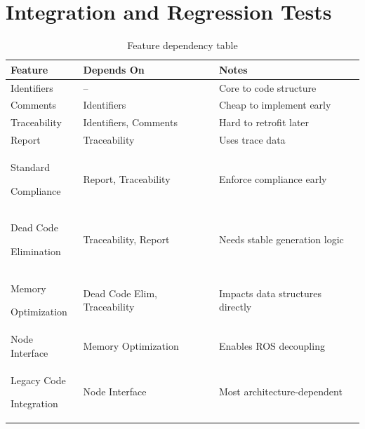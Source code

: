 \section{Integration and Regression Tests}
\label{app:int_and_reg_tests}


\bgroup
{}
\begin{xltabular}{\textwidth}{X X X}
	\caption{Feature dependency table}
	\label{tab:app_int_and_reg_tests}\\
	\toprule
	Feature & Depends On & Notes \\
	\midrule
	Identifiers & – & Core to code structure \\
	Comments & Identifiers & Cheap to implement early \\
	Traceability & Identifiers, Comments & Hard to retrofit later \\
	Report & Traceability & Uses trace data \\
	Standard\par Compliance & Report, Traceability & Enforce compliance early \\
	Dead Code\par Elimination & Traceability, Report & Needs stable generation logic \\
	Memory\par Optimization & Dead Code Elim, Traceability & Impacts data structures directly \\
	Node Interface & Memory Optimization & Enables \gls{ROS} decoupling \\
	Legacy Code\par Integration & Node Interface & Most architecture-dependent \\
	\bottomrule
\end{xltabular}










